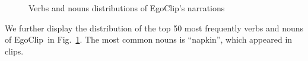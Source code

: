 \documentclass{article}
\newcommand{\dataset}{EgoClip}
\begin{document}
\begin{figure}[htb]
\vspace{-0.25cm}
\centering
{}
\vspace{-0.25cm}
\centering
\caption{Verbs and nouns distributions of \dataset’s narrations}
\label{fig_egoclip_v_n}
\vspace{-0.25cm}
\end{figure} We further display the distribution of the top 50 most frequently verbs and nouns of \dataset~in Fig.~\ref{fig_egoclip_v_n}.
The most common nouns is ``napkin'', which appeared in  clips. 
\end{document}
